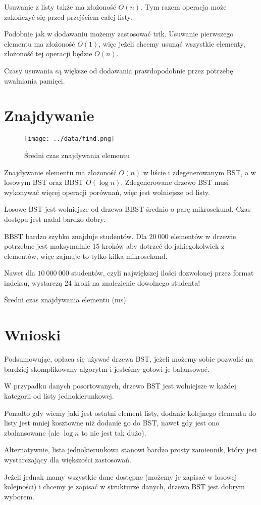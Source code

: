 \documentclass[11pt,twocolumn]{article}
\begin{document}
Usuwanie z listy także ma złożoność $O(n)$. Tym razem operacja może zakończyć się przed przejściem całej listy.

Podobnie jak w dodawaniu możemy zastosować trik. Usuwanie pierwszego elementu ma złożoność $O(1)$, więc jeżeli chcemy usunąć wszystkie elementy, złożoność tej operacji będzie $O(n)$.

Czasy usuwania są większe od dodawania prawdopodobnie przez potrzebę uwalniania pamięci.



\section{Znajdywanie}

\begin{figure}[h!]
	\texttt{[image: ../data/find.png]}
	\caption{Średni czas znajdywania elementu \label{find}}
\end{figure}

Znajdywanie elementu ma złożoność $O(n)$ w liście i zdegenerowanym BST, a w losowym BST oraz BBST $O(\log n)$. Zdegenerowane drzewo BST musi wykonywać więcej operacji porównań, więc jest wolniejsze od listy.

Losowe BST jest wolniejsze od drzewa BBST średnio o parę mikrosekund. Czas dostępu jest nadal bardzo dobry.

BBST bardzo szybko znajduje studentów. Dla $20\ 000$ elementów w drzewie potrzebne jest maksymalnie 15 kroków aby dotrzeć do jakiegokolwiek z elementów, więc zajmuje to tylko kilka mikrosekund.

Nawet dla $10\ 000\ 000$ studentów, czyli największej ilości dozwolonej przez format indeksu, wystarczą 24 kroki na znalezienie dowolnego studenta!

\begin{table}[h]
	\centering
	\caption{Średni czas znajdywania elementu (ms)}
\end{table}



\section{Wnioski}

Podsumowując, opłaca się używać drzewa BST, jeżeli możemy sobie pozwolić na bardziej skomplikowany algorytm i jesteśmy gotowi je balansować.

W przypadku danych posortowanych, drzewo BST jest wolniejsze w każdej kategorii od listy jednokierunkowej.

Ponadto gdy wiemy jaki jest ostatni element listy, dodanie kolejnego elementu do listy jest mniej kosztowne niż dodanie go do BST, nawet gdy jest ono zbalansowane (ale $\log n$ to nie jest tak dużo).

Alternatywnie, lista jednokierunkowa stanowi bardzo prosty zamiennik, który jest wystarczający dla większości zastosowań.

Jeżeli jednak mamy wszystkie dane dostępne (możemy je zapisać w losowej kolejności) i chcemy je zapisać w strukturze danych, drzewo BST jest dobrym wyborem.
\end{document}
